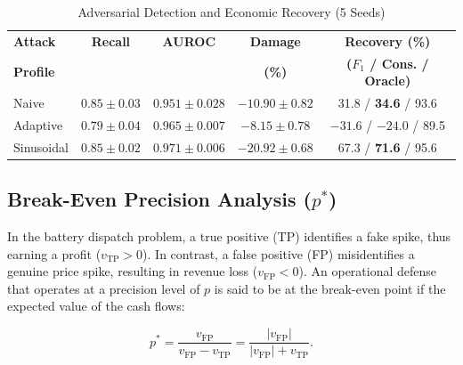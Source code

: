 \documentclass[journal]{IEEEtran}
\begin{document}
\begin{table}[!t]
    \centering
    \caption{Adversarial Detection and Economic Recovery (5 Seeds)}
    \label{tab:adv_detect}
    \scriptsize
    \renewcommand{\arraystretch}{1.15}
    \setlength{\tabcolsep}{0.6pt}
    \begin{tabular*}{\columnwidth}{@{\extracolsep{\fill}}lcccc}
    \toprule
    \textbf{Attack} & \textbf{Recall} & \textbf{AUROC} & \textbf{Damage} & \textbf{Recovery (\%)} \\
    \textbf{Profile} & & & \textbf{(\%)} & \textbf{($F_1$ / Cons. / Oracle)} \\
    \midrule
    Naive & $0.85\pm 0.03$ & $0.951\pm 0.028$ & $-10.90\pm 0.82$ & 31.8 / \textbf{34.6} / 93.6 \\
    Adaptive & $0.79\pm 0.04$ & $0.965\pm 0.007$ & $-8.15\pm 0.78$ & $-31.6$ / $-24.0$ / 89.5 \\
    Sinusoidal & $0.85\pm 0.02$ & $0.971\pm 0.006$ & $-20.92\pm 0.68$ & 67.3 / \textbf{71.6} / 95.6 \\
    \bottomrule
    \end{tabular*}
    \end{table}

\subsection{Break-Even Precision Analysis ($p^*$)}

In the battery dispatch problem, a true positive (TP) identifies a fake spike, thus earning a profit ($v_{\text{TP}} > 0$). In contrast, a false positive (FP) misidentifies a genuine price spike, resulting in revenue loss ($v_{\text{FP}} < 0$). An operational defense that operates at a precision level of $p$ is said to be at the break-even point if the expected value of the cash flows:

\begin{equation}
    p^* = \frac{v_{\text{FP}}}{v_{\text{FP}} - v_{\text{TP}}} = \frac{|v_{\text{FP}}|}{|v_{\text{FP}}| + v_{\text{TP}}}.
    \label{eq:breakeven}
    \end{equation}
\end{document}
